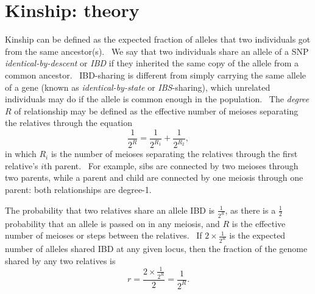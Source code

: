 \documentclass[
]{book}
\begin{document}
\hypertarget{kinship-theory}{%
\section{Kinship: theory}\label{kinship-theory}}

Kinship can be defined as the expected fraction of alleles that two individuals got from the same ancestor(s).~ We say that two individuals share an allele of a SNP \emph{identical-by-descent} or \emph{IBD} if they inherited the same copy of the allele from a common ancestor.~ IBD-sharing is different from simply carrying the same allele of a gene (known as \emph{identical-by-state} or \emph{IBS}-sharing), which unrelated individuals may do if the allele is common enough in the population.~ The \emph{degree} \(R\) of relationship may be defined as the effective number of meioses separating the relatives through the equation \begin{equation}\frac{1}{2^R}=\frac{1}{2^{R_1}}+\frac{1}{2^{R_2}},\tag{1}\end{equation}in which \(R_i\) is the number of meioses separating the relatives through the first relative's \(i\)th parent.~ For example, sibs are connected by two meioses through two parents, while a parent and child are connected by one meiosis through one parent: both relationships are degree-1.

The probability that two relatives share an allele IBD is \(\frac{1}{2^R}\), as there is a \(\frac{1}{2}\) probability that an allele is passed on in any meiosis, and \(R\) is the effective number of meioses or steps between the relatives.~ If \(2\times\frac{1}{2^R}\) is the expected number of alleles shared IBD at any given locus, then the fraction of the genome shared by any two relatives is\begin{equation}r=\frac{2\times\frac{1}{2^R}}{2}=\frac{1}{2^R}.\tag{2}\end{equation}
\end{document}
